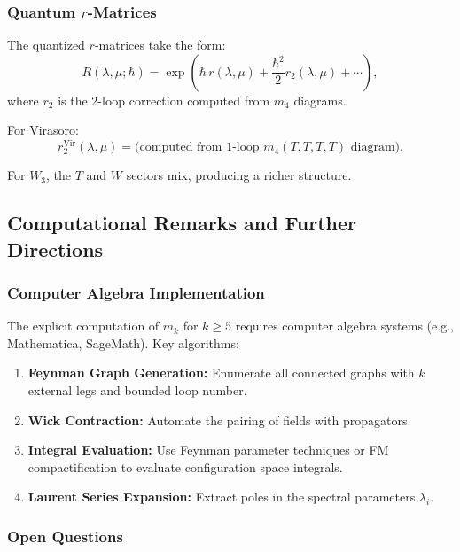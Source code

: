 \subsubsection{Quantum $r$-Matrices}

The quantized $r$-matrices take the form:
\begin{equation}
R(\lambda,\mu; \hbar) = \exp\left( \hbar \, r(\lambda,\mu) + \frac{\hbar^2}{2} r_2(\lambda,\mu) + \cdots \right),
\end{equation}
where $r_2$ is the 2-loop correction computed from $m_4$ diagrams.

For Virasoro:
\begin{equation}
r_2^{\text{Vir}}(\lambda,\mu) = \text{(computed from 1-loop } m_4(T,T,T,T) \text{ diagram)}.
\end{equation}

For $W_3$, the $T$ and $W$ sectors mix, producing a richer structure.

\subsection{Computational Remarks and Further Directions}

\subsubsection{Computer Algebra Implementation}

The explicit computation of $m_k$ for $k \geq 5$ requires computer algebra systems (e.g., Mathematica, SageMath). Key algorithms:
\begin{enumerate}
\item \textbf{Feynman Graph Generation:} Enumerate all connected graphs with $k$ external legs and bounded loop number.
\item \textbf{Wick Contraction:} Automate the pairing of fields with propagators.
\item \textbf{Integral Evaluation:} Use Feynman parameter techniques or FM compactification to evaluate configuration space integrals.
\item \textbf{Laurent Series Expansion:} Extract poles in the spectral parameters $\lambda_i$.
\end{enumerate}

\subsubsection{Open Questions}

